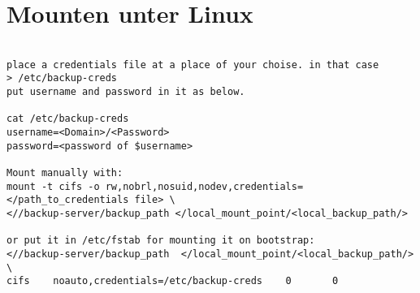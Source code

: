 \documentclass[a4paper,10pt]{report}
\begin{document}
\section{Mounten unter Linux}
\begin{verbatim}

place a credentials file at a place of your choise. in that case 
> /etc/backup-creds
put username and password in it as below.

cat /etc/backup-creds
username=<Domain>/<Password>
password=<password of $username>

Mount manually with:
mount -t cifs -o rw,nobrl,nosuid,nodev,credentials=</path_to_credentials file> \
<//backup-server/backup_path </local_mount_point/<local_backup_path/>

or put it in /etc/fstab for mounting it on bootstrap:
<//backup-server/backup_path  </local_mount_point/<local_backup_path/>  \
cifs    noauto,credentials=/etc/backup-creds    0       0
\end{verbatim}
\end{document}
